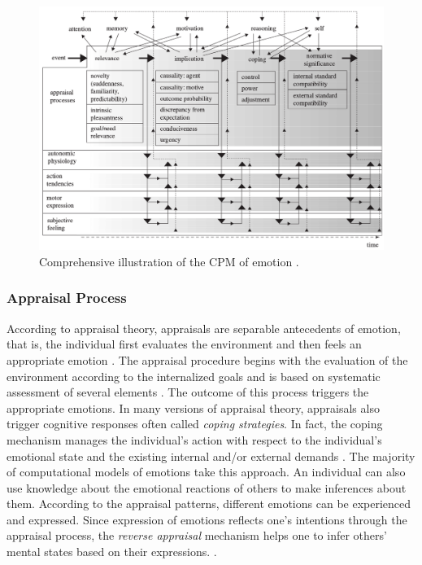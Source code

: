 \documentclass[12pt]{report}
\begin{document}
\begin{figure}[tbh]
  \center
  \includegraphics[width=\textwidth]{figure/comprehensive-CPM.png}
  \caption{Comprehensive illustration of the CPM of emotion
  \cite{scherer:dynamic-architecture-emotion,scherer:appraisal-processes}.}
  \label{fig:comp-cpm}
\end{figure}

\subsubsection{Appraisal Process}
\label{sec:appraisal-process}

According to appraisal theory, appraisals are separable antecedents of emotion,
that is, the individual first evaluates the environment and then feels an
appropriate emotion \cite{scherer:appraisal-processes}. The appraisal procedure
begins with the evaluation of the environment according to the internalized
goals and is based on systematic assessment of several elements
\cite{scherer:sequential-appraisal-process}. The outcome of this process
triggers the appropriate emotions. In many versions of appraisal theory,
appraisals also trigger cognitive responses often called \textit{coping
strategies}. In fact, the coping mechanism manages the individual's action with
respect to the individual's emotional state and the existing internal and/or
external demands \cite{folkman:coping-pitfalls-promise}. The majority of
computational models of emotions take this approach. An individual can also use
knowledge about the emotional reactions of others to make inferences about them.
According to the appraisal patterns, different emotions can be experienced and
expressed. Since expression of emotions reflects one's intentions through the
appraisal process, the \textit{reverse appraisal} mechanism helps one to infer
others' mental states based on their expressions.
\cite{gratch:reverse-appraisal, hareli:emotional-reaction-perception}.
\end{document}
